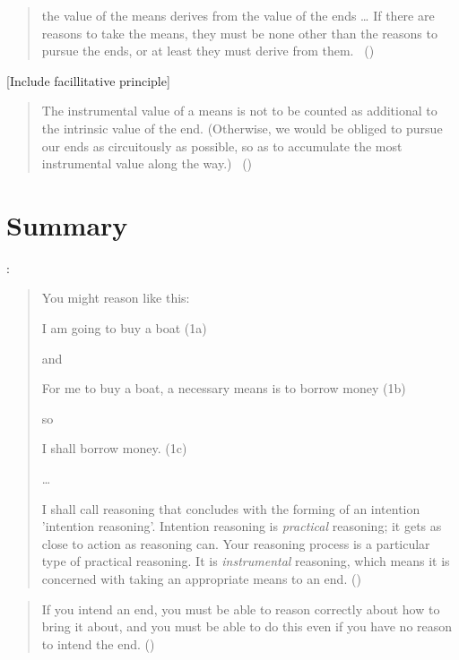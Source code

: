 \documentclass[10pt]{article}
\newcommand{\hozlinedash}[0]{%
  \noindent\hdashrule[0.5ex][c]{\textwidth}{.1pt}{2.5pt}
}
\begin{document}
\hozlinedash

\begin{quote}
    the value of the means derives from the value of the ends \dots
    If there are reasons to take the means, they must be none other than the reasons to pursue the ends, or at least they must derive from them.\nolinebreak
  \mbox{ }\hfill(\cite[2]{Raz:2005aa})
\end{quote}


[Include facillitative principle]

\hozlinedash

\begin{quote}
  The instrumental value of a means is not to be counted as additional to the intrinsic value of the end.
  (Otherwise, we would be obliged to pursue our ends as circuitously as possible, so as to accumulate the most instrumental value along the way.)\nolinebreak
  \mbox{ }\hfill(\cite[65]{Velleman:2000ab})
\end{quote}

\hozlinedash

\newpage

\section{Summary}
\label{sec:summary}


\citeauthor{Broome:2002aa}:

\begin{quote}
  You might reason like this:

  \mbox{}\quad I am going to buy a boat \hfill (1a)

  and

  \mbox{}\quad For me to buy a boat, a necessary means is to borrow money \hfill (1b)

  so

  \mbox{}\quad I shall borrow money. \hfill (1c)

  \dots

  I shall call reasoning that concludes with the forming of an intention 'intention reasoning'.
  Intention reasoning is \emph{practical} reasoning; it gets as close to action as reasoning can.
  Your reasoning process is a particular type of practical reasoning.
  It is \emph{instrumental} reasoning, which means it is concerned with taking an appropriate means to an end.\nolinebreak
  \mbox{}\hfill\mbox{(\citeyear[86]{Broome:2002aa})}
\end{quote}

\begin{quote}
  If you intend an end, you must be able to reason correctly about how to bring it about, and you must be able to do this even if you have no reason to intend the end.\nolinebreak
  \mbox{}\hfill\mbox{(\citeyear[96]{Broome:2002aa})}
\end{quote}
\end{document}
